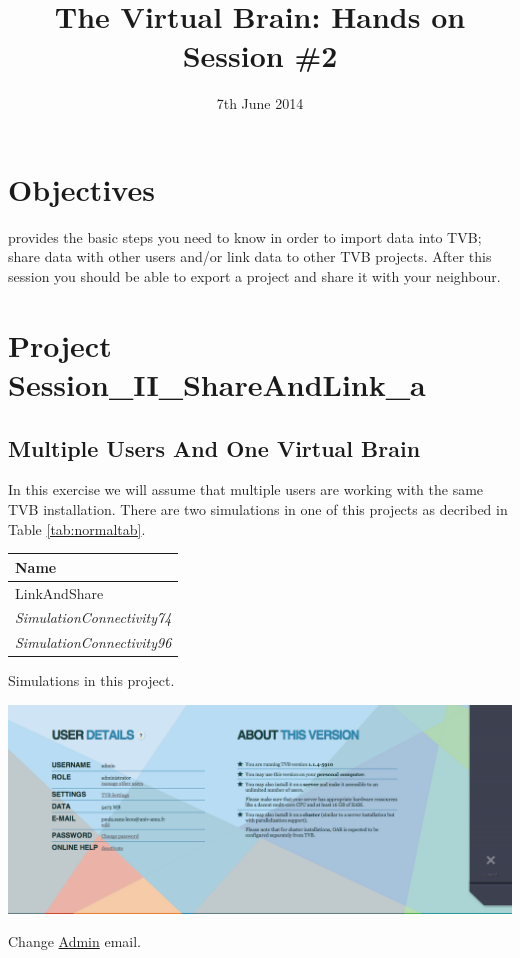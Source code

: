 \documentclass{tufte-handout}
\title{The Virtual Brain: Hands on Session \#2}
\date{7th June 2014}
\begin{document}

\newpage
\ClearWallPaper

\section{Objectives}\label{sec:objectives}

 provides the basic steps you need to know in order to import data into TVB; share data with other users and/or link data to other TVB projects.
After this session you should be able to export a project and share it with your neighbour. 

\section{Project Session\_II\_ShareAndLink\_a}\label{sec:project_data}

\subsection{Multiple Users And One Virtual Brain}\label{sec:multiusers}
In this exercise we will assume that multiple users are working with the same TVB installation.  There are two simulations in one of this projects as decribed in Table \ref{tab:normaltab}.

\begin{margintable}
  \centering
  \selectfont
  \begin{tabular}{l}
    \toprule
    Name \\
    \midrule
    \multicolumn{1}{l}{LinkAndShare}\\
    \textit{SimulationConnectivity74} \\
    \textit{SimulationConnectivity96} \\
    \bottomrule
  \end{tabular}
  \caption{Simulations in this project.}
  \label{tab:normaltab}
\end{margintable}


\begin{marginfigure}
  \includegraphics[width=\linewidth]{Handout_UI_LinkAndShare_ChangeAdminEmail}%
  \caption{Change \underline{Admin} email.}%
  \label{fig:change_email}%
\end{marginfigure}
\end{document}
